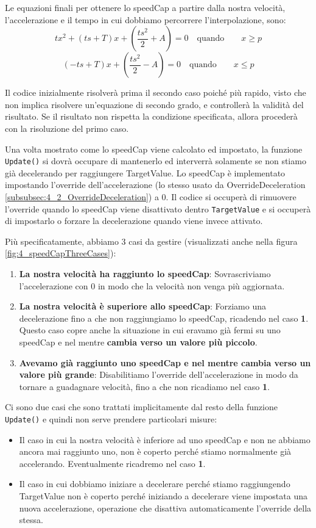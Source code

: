 \documentclass[main.tex]{subfiles}
\begin{document}
\noindent Le equazioni finali per ottenere lo speedCap a partire dalla nostra velocità, l'accelerazione e il tempo in cui dobbiamo percorrere l'interpolazione, sono:
\[tx^2 + (ts + T)x + (\frac{ts^2}{2} + A) = 0 \quad\text{quando}\qquad x \geq p\]
\[(-ts + T)x + (\frac{ts^2}{2} - A) = 0 \quad\text{quando}\qquad x \leq p\]

\noindent Il codice inizialmente risolverà prima il secondo caso poiché più rapido, visto che non implica risolvere un'equazione di secondo grado, e controllerà la validità del risultato. Se il risultato non rispetta la condizione specificata, allora procederà con la risoluzione del primo caso. \newline

Una volta mostrato come lo speedCap viene calcolato ed impostato, la funzione \lstinline{Update()} si dovrà occupare di mantenerlo ed interverrà solamente se non stiamo già decelerando per raggiungere TargetValue. Lo speedCap è implementato impostando l'override dell'accelerazione (lo stesso usato da OverrideDeceleration \ref{subsubsec:4_2_OverrideDeceleration}) a 0. Il codice si occuperà di rimuovere l'override quando lo speedCap viene disattivato dentro \lstinline{TargetValue} e si occuperà di impostarlo o forzare la decelerazione quando viene invece attivato.

\noindent Più specificatamente, abbiamo 3 casi da gestire (visualizzati anche nella figura \ref{fig:4_speedCapThreeCases}):
\begin{enumerate}
    \item \textbf{La nostra velocità ha raggiunto lo speedCap}: Sovrascriviamo l'accelerazione con 0 in modo che la velocità non venga più aggiornata.
    \item \textbf{La nostra velocità è superiore allo speedCap}: Forziamo una decelerazione fino a che non raggiungiamo lo speedCap, ricadendo nel caso \textbf{1}. Questo caso copre anche la situazione in cui eravamo già fermi su uno speedCap e nel mentre \textbf{cambia verso un valore più piccolo}.
    \item \textbf{Avevamo già raggiunto uno speedCap e nel mentre cambia verso un valore più grande}: Disabilitiamo l'override dell'accelerazione in modo da tornare a guadagnare velocità, fino a che non ricadiamo nel caso \textbf{1}.
\end{enumerate}

\noindent Ci sono due casi che sono trattati implicitamente dal resto della funzione \lstinline{Update()} e quindi non serve prendere particolari misure:
\begin{itemize}
    \item Il caso in cui la nostra velocità è inferiore ad uno speedCap e non ne abbiamo ancora mai raggiunto uno, non è coperto perché stiamo normalmente già accelerando. Eventualmente ricadremo nel caso \textbf{1}.
    \item Il caso in cui dobbiamo iniziare a decelerare perché stiamo raggiungendo TargetValue non è coperto perché iniziando a decelerare viene impostata una nuova accelerazione, operazione che disattiva automaticamente l'override della stessa.
\end{itemize}
\end{document}
